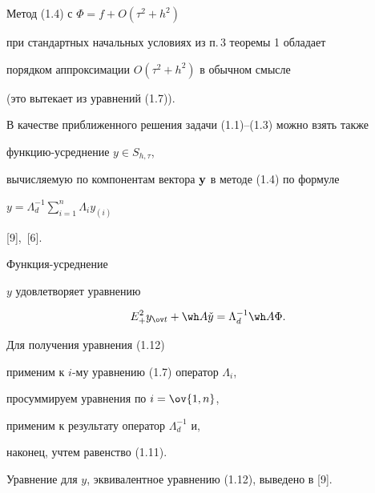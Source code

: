 




\begin{notenonum} Метод (1.4) с $\Phi=f+O(\tau^2+h^2)$


при стандартных начальных условиях из п.\,3 теоремы 1 обладает


порядком аппроксимации $O(\tau^2+h^2)$ в обычном смысле 


(это вытекает из уравнений (1.7)).


\end{notenonum}





В качестве приближенного решения задачи (1.1)--(1.3) можно взять также


функцию-усред\-не\-ние $y\in S_{h,\tau}$,


вычисляемую по компонентам вектора $\bold y$ в методе (1.4) по формуле


$y=\Lambda_d^{-1}\sum\limits_{i=1}^n\Lambda_iy_{(i)}$


[9],~[6].





\begin{cor} Функция-усреднение


$y$ удовлетворяет уравнению


\begin{equation}


E_+^2y_{\ov t}+\wh A \Check y=\Lambda_d^{-1}\wh A  \Phi.


\end{equation}


\end{cor}





\begin{pf} Для получения уравнения (1.12)


применим к $i$-му уравнению (1.7) оператор $\Lambda_i$, 


просуммируем уравнения по $i=\ov{1,n}$,


применим к результату оператор $\Lambda_d^{-1}$ и, 


наконец, учтем равенство (1.11).


\end{pf}





Уравнение для $y$, эквивалентное уравнению (1.12), выведено в [9].





